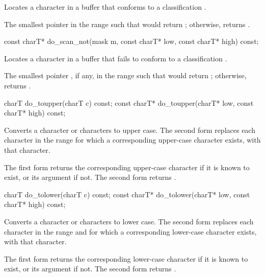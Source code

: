 \begin{itemdescr}
\pnum
\effects
Locates a character in a buffer that conforms to a classification .

\pnum
\returns
The smallest pointer  in the range 
such that  would return ;
otherwise, returns .
\end{itemdescr}

%
\begin{itemdecl}
const charT* do_scan_not(mask m, const charT* low, const charT* high) const;
\end{itemdecl}

\begin{itemdescr}
\pnum
\effects
Locates a character in a buffer that fails to conform to a classification
.

\pnum
\returns
The smallest pointer , if any, in the range 
such that  would return ;
otherwise, returns .
\end{itemdescr}

%
\begin{itemdecl}
charT        do_toupper(charT c) const;
const charT* do_toupper(charT* low, const charT* high) const;
\end{itemdecl}

\begin{itemdescr}
\pnum
\effects
Converts a character or characters to upper case.
The second form replaces
each character  in the range 
for which a corresponding upper-case character exists,
with that character.

\pnum
\returns
The first form returns
the corresponding upper-case character if it is known to exist, or
its argument if not.
The second form returns .
\end{itemdescr}

%
\begin{itemdecl}
charT        do_tolower(charT c) const;
const charT* do_tolower(charT* low, const charT* high) const;
\end{itemdecl}

\begin{itemdescr}
\pnum
\effects
Converts a character or characters to lower case.
The second form replaces
each character  in the range 
and for which a corresponding lower-case character exists,
with that character.

\pnum
\returns
The first form returns
the corresponding lower-case character if it is known to exist, or
its argument if not.
The second form returns .
\end{itemdescr}

